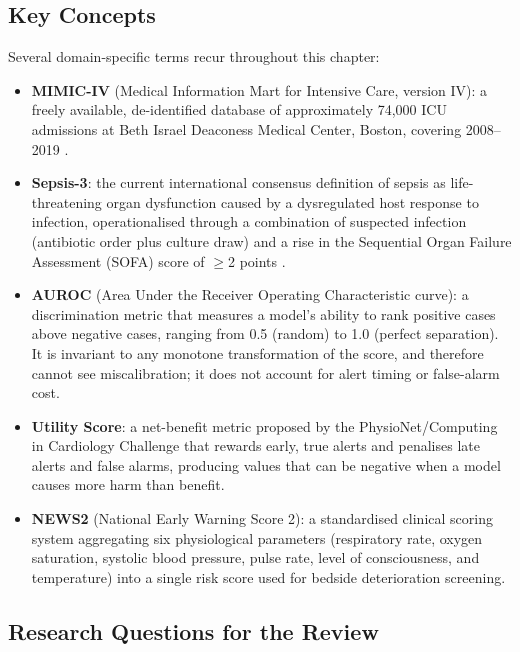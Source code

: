 \subsection*{Key Concepts}

Several domain-specific terms recur throughout this chapter:

\begin{itemize}
    \item \textbf{MIMIC-IV} (Medical Information Mart for Intensive Care, version
    IV): a freely available, de-identified database of approximately 74,000 ICU
    admissions at Beth Israel Deaconess Medical Center, Boston, covering
    2008--2019 \cite{johnson2023mimiciv}.
    \item \textbf{Sepsis-3}: the current international consensus definition of
    sepsis as life-threatening organ dysfunction caused by a dysregulated host
    response to infection, operationalised through a combination of suspected
    infection (antibiotic order plus culture draw) and a rise in the Sequential
    Organ Failure Assessment (SOFA) score of $\geq$2 points
    \cite{singer2016sepsis3}.
    \item \textbf{AUROC} (Area Under the Receiver Operating Characteristic
    curve): a discrimination metric that measures a model's ability to rank
    positive cases above negative cases, ranging from 0.5 (random) to 1.0
    (perfect separation). It is invariant to any monotone transformation of the
    score, and therefore cannot see miscalibration; it does not account for
    alert timing or false-alarm cost.
    \item \textbf{Utility Score}: a net-benefit metric proposed by the
    PhysioNet/Computing in Cardiology Challenge \cite{reyna2020utility} that
    rewards early, true alerts and penalises late alerts and false alarms,
    producing values that can be negative when a model causes more harm than
    benefit.
    \item \textbf{NEWS2} (National Early Warning Score 2): a standardised
    clinical scoring system aggregating six physiological parameters (respiratory
    rate, oxygen saturation, systolic blood pressure, pulse rate, level of
    consciousness, and temperature) into a single risk score used for bedside
    deterioration screening.
\end{itemize}

\subsection*{Research Questions for the Review}

